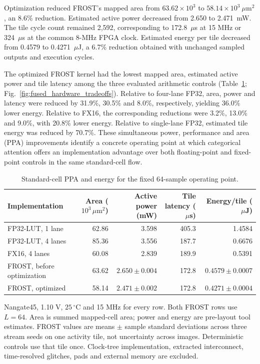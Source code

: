 Optimization reduced FROST's mapped area from
$63.62\times10^3$ to $58.14\times10^3~\mu\mathrm{m}^2$, an 8.6\%
reduction. Estimated active power decreased from 2.650 to 2.471~mW.
The tile cycle count remained 2,592, corresponding to 172.8~$\mu$s
at 15 MHz or 324~$\mu$s at the common 8-MHz FPGA clock.
Estimated energy per tile decreased from 0.4579 to 0.4271~$\mu$J,
a 6.7\% reduction obtained with unchanged sampled outputs and
execution cycles.

The optimized FROST kernel had the lowest mapped area, estimated active
power and tile latency among the three evaluated arithmetic controls
(Table~\ref{tab:fused_asic_power}; Fig.~\ref{fig:fused_hardware_tradeoffs}).
Relative to four-lane FP32, area, power and latency were reduced by
31.9\%, 30.5\% and 8.0\%, respectively, yielding 36.0\% lower energy.
Relative to FX16, the corresponding reductions were 3.2\%, 13.0\%
and 9.0\%, with 20.8\% lower energy. Relative to single-lane FP32,
estimated tile energy was reduced by 70.7\%.
These simultaneous power, performance and area (PPA) improvements
identify a concrete operating point at which categorical attention
offers an implementation advantage over both floating-point and
fixed-point controls in the same standard-cell flow.

\begin{table}[!htbp]
\centering
\caption{Standard-cell PPA and energy for the fixed 64-sample operating point.}
\label{tab:fused_asic_power}
\fontsize{8}{9.5}\selectfont
\setlength{\tabcolsep}{3pt}
\begin{tabular*}{\linewidth}{@{\extracolsep{\fill}}lrrrr@{}}
\toprule
Implementation
& \shortstack{Area\\($10^3\,\mu\mathrm{m}^2$)}
& \shortstack{Active power\\(mW)}
& \shortstack{Tile latency\\($\mu$s)}
& \shortstack{Energy/tile\\($\mu$J)} \\
\midrule
FP32-LUT, 1 lane & 62.86 & 3.598 & 405.3 & 1.4584 \\
FP32-LUT, 4 lanes & 85.36 & 3.556 & 187.7 & 0.6676 \\
FX16, 4 lanes & 60.08 & 2.839 & 189.9 & 0.5391 \\
FROST, before optimization
& 63.62 & $2.650\pm0.004$ & 172.8 & $0.4579\pm0.0007$ \\
FROST, optimized
& 58.14 & $2.471\pm0.002$ & 172.8 & $0.4271\pm0.0004$ \\
\bottomrule
\end{tabular*}
\par\smallskip\footnotesize
Nangate45, 1.10 V, $25\,^{\circ}$C and 15 MHz for every row.
Both FROST rows use $L=64$. Area is summed mapped-cell area; power
and energy are pre-layout tool estimates. FROST values are means
$\pm$ sample standard deviations across three stream seeds on one
activity tile, not uncertainty across images. Deterministic controls
use that tile once. Clock-tree implementation, extracted interconnect,
time-resolved glitches, pads and external memory are excluded.
\end{table}

